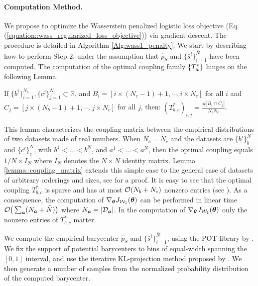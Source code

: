 \documentclass[letterpaper]{article}
\renewcommand{\eqref}[1]{Eq. (\ref{#1})}
\theoremstyle{definition}
\newcommand{\W}{\mathcal{W}}
\newcommand{\bS}{\bar{S}}
\begin{document}
\paragraph{Computation Method.}
We propose to optimize the Wasserstein penalized logistic loss objective (\eqref{equation::wass_regularized_loss_objective}) via gradient descent. The procedure is detailed in Algorithm \ref{Alg:wass1_penalty}. We start by describing how to perform Step 2. under the assumption that $\hat{p}_{\bS}$ and $\{\bar s^i\}_{i=1}^{\bar{N}}$ have been computed. The computation of the optimal coupling family $\{ T_{\bm{a}}^*\}$ hinges on the following Lemma.

\begin{lemma}\label{lemma::coupling_matrix}
If $\{ b^i \}_{i=1}^{N_b}, \{ c^j \}_{j=1}^{N_c} \subset \mathbb{R}$,  and $B_i = [i\times (N_c-1) + 1, \cdots , i\times N_c]$ for all $i$ and $C_j = [j\times (N_b-1) +1,\cdots, j\times N_c]$ for all $j$, then: 
    $ (T_{b,c}^*)_{i,j} = 
                    \frac{ \#\left| B_i \cap C_j \right|}{N_b N_c}$.
\end{lemma}
This lemma characterizes the coupling matrix between the empirical distributions of two datasets made of real numbers. When $N_b = N_c$ and the datasets are $\{b^i\}^N_b$ and $\{c^i\}^N_c$, with $b^1 < \ldots < b^N$, and $a^1 < \ldots < a^N$, then the optimal coupling equals $1/N \times I_N$ where $I_N$ denotes the $N \times N$ identity matrix. Lemma \ref{lemma::coupling_matrix} extends this simple case to the general case of datasets of arbitrary orderings and sizes, see \cite{deshpande18generative} for a proof. It is easy to see that the optimal coupling $T_{b,c}^*$ is sparse and has at most ${\cal O}(N_b + N_c)$ nonzero entries (see \cite{cuturi13sinkhorn}). As a consequence, the computation of $\nabla_\vtheta J_{\W_1}(\vtheta)$ can be performed in linear time ${\cal O}\big(\sum_{{\bm{a}}} (N_{\bm{a}} + \bar{N})\big)$ where $N_{{\bm{a}}}=| \mathcal{D}_{{\bm{a}}}|$. In the computation of $\nabla_\vtheta J_{\W_1}(\vtheta)$ only the nonzero entries of $T_{b,c}^*$ matter.

We compute the empirical barycenter $\hat{p}_{\bS}$ and $\{\bar s^i \}_{i=1}^{\bar{N}}$, using the POT library by \cite{flamary2017pot}. We fix the support of potential barycenters to bins of equal-width spanning the $[0,1]$ interval, and use the iterative KL-projection method proposed by \cite{benamou15iterative}. We then generate a number of samples from the normalized probability distribution of the computed barycenter. 
\end{document}

